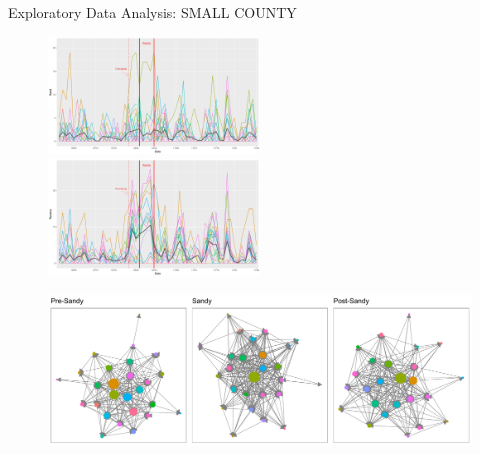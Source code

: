 \documentclass[10pt]{beamer}
\theoremstyle{definition}
\theoremstyle{remark}
\begin{document}
\begin{frame}{Exploratory Data Analysis: SMALL COUNTY}
	\begin{minipage}{0.85\linewidth}
	 	 \begin{figure}
	 	 	\includegraphics[width=0.5\textwidth]{figures/Sendplot.pdf}	 	
	 	 	\includegraphics[width=0.5\textwidth]{figures/Receiveplot.pdf}
	 	 \end{figure}	
	 \begin{figure}
	 		 	\includegraphics[width=1\textwidth]{figures/Networkplot.pdf}
	 		 		 \end{figure}	
\end{minipage}
\begin{minipage}{0.13\linewidth}
		 \begin{figure}

\end{figure}
\end{minipage}
\end{frame}
\end{document}

